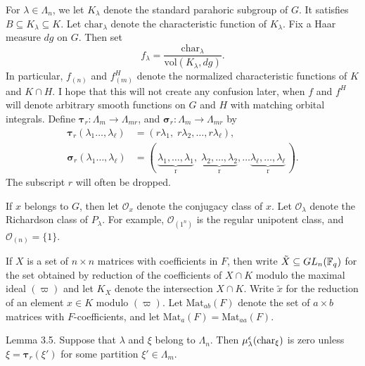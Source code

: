 \documentclass{amsart}
\begin{document}
For $\lambda\in\Lambda_n$, we let $K_\lambda$ denote
the standard parahoric subgroup of $G$.  It satisfies
$B\subseteq K_\lambda\subseteq K$.  Let $\text{char}_\lambda$
denote the characteristic function of $K_\lambda$.
Fix a Haar measure $dg$ on $G$.  Then set
$$f_{\lambda}
     = \frac
           { \text{char}_{\lambda} }
           { \text{vol}(K_{\lambda}, dg) }.$$
  In particular, 
     $ f_{(n)} $ and $f^H_{(m)}$ denote the normalized
     characteristic functions of $K$ and $K\cap H$.  I
     hope that this will not create any confusion later,
     when $f$ and $f^H$ will denote arbitrary 
     smooth functions on $G$ and $H$ with matching
     orbital integrals.
   Define $\pmb\tau_r:\Lambda_m\to\Lambda_{mr}$,
  and $\pmb\sigma_r:\Lambda_m\to\Lambda_{mr}$ by
\begin{align*}
    \pmb\tau_r
      (\lambda_1 \dots , \lambda_{\ell} ) &=
      (r \lambda_1, \; r \lambda_2, \dots , r \lambda_{\ell} ), \;\;\;
\\
  \pmb\sigma_r
     (\lambda_1 \dots , \lambda_{\ell} ) &=
  ( \,
        \underbrace{\lambda_1, \dots, \lambda_1}_\text{r} , \;
        \underbrace{\lambda_2, \dots, \lambda_2}_\text{r} , \dots
        \underbrace{\lambda_{\ell}, \dots, \lambda_{\ell}}_\text{r} \, 
  ).
\end{align*}
%
The subscript $r$ will often be dropped.

If $ x$ belongs to $G$, then let $ \mathcal O_x $
    denote the conjugacy class of $x$.
%
Let ${\mathcal O}_{\lambda}$ denote the Richardson class of 
      $ P_{\lambda} $.
%
  For example,  $ {\mathcal O}_{(1^n)}$ is the 
regular unipotent class, and $ {\mathcal O}_{(n)} = \{1\} $.


If $X$ is a set of 
  $ n \times n $
matrices with coefficients in $F$, then write
  $ \tilde{X} \subseteq GL_n ({\Bbb F}_q) $
for the set obtained by reduction of the coefficients of 
  $ X \cap K $
modulo the maximal ideal $(\varpi)$
and let
  $ K_X $ denote the intersection
  $ X \cap K $.
Write
  $ \tilde{x} $
for the reduction of
  an element $ x \in K$
modulo $(\varpi)$.
Let
  $ \text{Mat}_{ab} (F) $
denote the set of 
  $ a \times b $
matrices with  $F$-coefficients, and let
  $ \text{Mat}_a (F) = \text{Mat}_{aa} (F) $.

\proclaim Lemma {3.5}.
Suppose that $\lambda$ and $\xi$ belong to $\Lambda_n$.
Then
  $ \mu_{\lambda}^{\epsilon}
    (\text{{\rm char}}_{\xi})$ is zero
unless
  $ \xi = \pmb\tau_r (\xi') $
for some partition
  $ \xi' \in \Lambda_m $.
\finishproclaim
\end{document}
